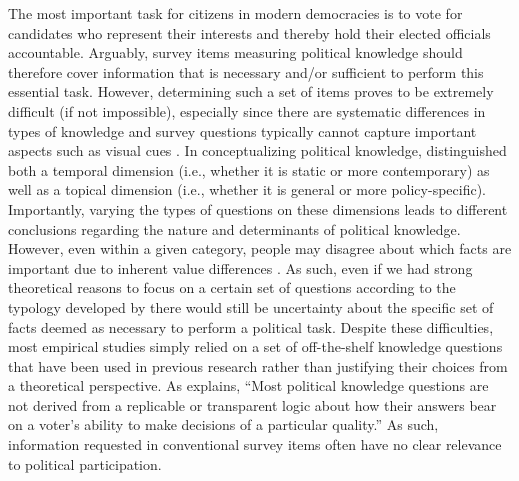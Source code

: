 \documentclass[12pt]{article}
\begin{document}
The most important task for citizens in modern democracies is to vote for candidates who represent their interests and thereby hold their elected officials accountable. Arguably, survey items measuring political knowledge should therefore cover information that is necessary and/or sufficient to perform this essential task. However, determining such a set of items proves to be extremely difficult (if not impossible), especially since there are systematic differences in types of knowledge \citep{barabas2014question} and survey questions typically cannot capture important aspects such as visual cues \citep{prior2014visual}. In conceptualizing political knowledge, \citet{barabas2014question} distinguished both a temporal dimension (i.e., whether it is static or more contemporary) as well as a topical dimension (i.e., whether it is general or more policy-specific). Importantly, varying the types of questions on these dimensions leads to different conclusions regarding the nature and determinants of political knowledge. However, even within a given category, people may disagree about which facts are important due to inherent value differences \citep[c.f.,][]{lupia2015uninformed}. As such, even if we had strong theoretical reasons to focus on a certain set of questions according to the typology developed by \citet{barabas2014question} there would still be uncertainty about the specific set of facts deemed as necessary to perform a political task. Despite these difficulties, most empirical studies simply relied on a set of off-the-shelf knowledge questions that have been used in previous research rather than justifying their choices from a theoretical perspective. As \citet[219]{lupia2006elitism} explains, ``Most political knowledge questions are not derived from a replicable or transparent logic about how their answers bear on a voter's ability to make decisions of a particular quality.'' As such, information requested in conventional survey items often have no clear relevance to political participation. 
\end{document}

